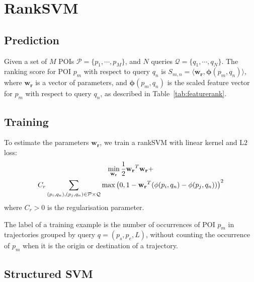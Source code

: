 {%





\section{RankSVM}
\label{appendix:ranksvm}

\subsection{Prediction}
Given a set of $M$ POIs $\mathcal{P} = \{p_1, \cdots, p_M\}$, 
and $N$ queries $\mathcal{Q} = \{q_1, \cdots, q_N\}$.
The ranking score for POI $p_m$ with respect to query $q_n$ is 
$S_{m,n} = \langle \mathbf{w_r}, \mathbf{\phi}(p_m, q_n) \rangle$,
where $\mathbf{w_r}$ is a vector of parameters,
and $\mathbf{\phi}(p_m, q_n)$ is the scaled feature vector for $p_m$ with respect to query $q_n$,
as described in Table~\ref{tab:featurerank}.

\subsection{Training}
To estimate the parameters $\mathbf{w_r}$, we train a rankSVM with linear kernel and L$2$ loss:
\begin{multline}
\min_{\mathbf{w_r}} \frac{1}{2} \mathbf{w_r}^T \mathbf{w_r} + \\ \hfill
                    C_r \sum_{(p_i, q_n), (p_j, q_n) \in \mathcal{P} \times \mathcal{Q}}
                    \max \left( 0, 1 - \mathbf{w_r}^T (\mathbf{\phi}(p_i, q_n) - \mathbf{\phi}(p_j, q_n)) \right)^2
\end{multline}
where $C_r > 0$ is the regularisation parameter.

The label of a training example is the number of occurrences of POI $p_m$ in trajectories grouped by query $q = (p_s, p_e, L)$,
without counting the occurrence of $p_m$ when it is the origin or destination of a trajectory.


\subsection{Structured SVM}
\label{sec:ssvm}
\secmoveup

}
